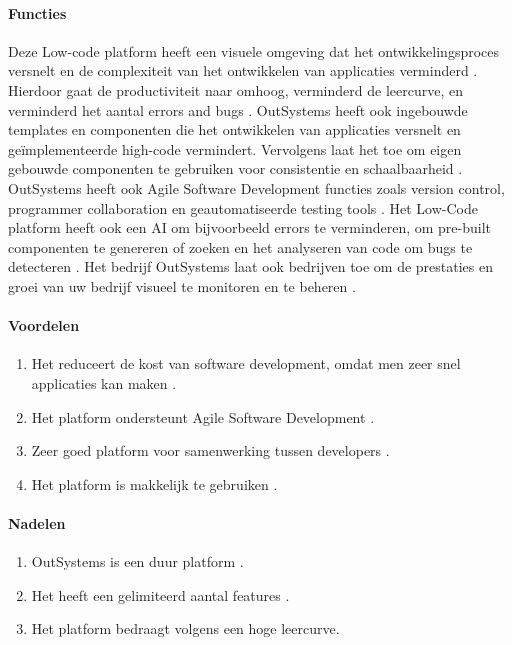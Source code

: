 \paragraph{Functies}
Deze Low-code platform heeft een visuele omgeving dat het ontwikkelingsproces versnelt en de complexiteit van het ontwikkelen van applicaties verminderd \autocite{Payne2023}.
Hierdoor gaat de productiviteit naar omhoog, verminderd de leercurve, en verminderd het aantal errors and bugs \autocite{Payne2023}. OutSystems heeft ook ingebouwde templates 
en componenten die het ontwikkelen van applicaties versnelt en geïmplementeerde high-code vermindert.
Vervolgens laat het toe om eigen gebouwde componenten te gebruiken voor consistentie en schaalbaarheid \autocite{Ranosys2023}.
OutSystems heeft ook Agile Software Development functies zoals version control, programmer collaboration en geautomatiseerde testing tools \autocite{Ranosys2023}.
Het Low-Code platform heeft ook een AI om bijvoorbeeld errors te verminderen, om pre-built componenten te genereren of zoeken en het analyseren van code om bugs te detecteren \autocite{Ranosys2023}.
Het bedrijf OutSystems laat ook bedrijven toe om de prestaties en groei van uw bedrijf visueel te monitoren en te beheren \autocite{Ranosys2023}.

\paragraph*{Voordelen}
\begin{enumerate}
    \item Het reduceert de kost van software development, omdat men zeer snel applicaties kan maken \autocite{Payne2023}.
    \item Het platform ondersteunt Agile Software Development \autocite{Payne2023}.
    \item Zeer goed platform voor samenwerking tussen developers \autocite{Payne2023}.
    \item Het platform is makkelijk te gebruiken \autocite{G22024OutSystems}.
\end{enumerate}


\paragraph*{Nadelen}
\begin{enumerate}
    \item OutSystems is een duur platform \autocite{G22024OutSystems}.
    \item Het heeft een gelimiteerd aantal features \autocite{G22024OutSystems}.
    \item Het platform bedraagt volgens \textcite{G22024OutSystems} een hoge leercurve.
\end{enumerate}

